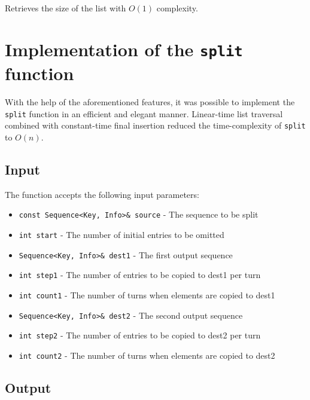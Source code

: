 ﻿\documentclass{article}
\begin{document}
Retrieves the size of the list with $O(1)$ complexity.

\section{Implementation of the {\tt split} function}

With the help of the aforementioned features, it was possible to implement the
{\tt split} function in an efficient and elegant manner. Linear-time list
traversal combined with constant-time final insertion reduced the
time-complexity of {\tt split} to $O(n)$.

\subsection{Input}

The function accepts the following input parameters:

\begin{itemize}
\item {\tt const Sequence<Key, Info>\& source} - The sequence to be split
\item {\tt int start} - The number of initial entries to be omitted
\item {\tt Sequence<Key, Info>\& dest1} - The first output sequence
\item {\tt int step1} - The number of entries to be copied to dest1 per turn
\item {\tt int count1} - The number of turns when elements are copied to dest1
\item {\tt Sequence<Key, Info>\& dest2} - The second output sequence
\item {\tt int step2} - The number of entries to be copied to dest2 per turn
\item {\tt int count2} - The number of turns when elements are copied to dest2
\end{itemize}

\subsection{Output}
\end{document}
